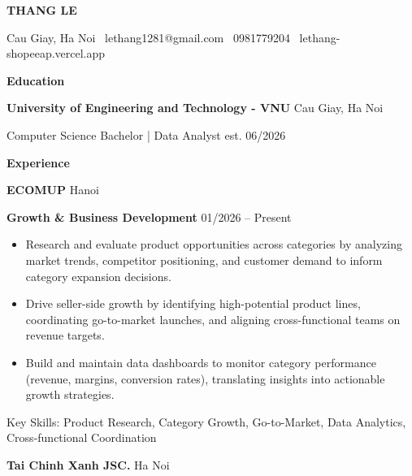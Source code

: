 \documentclass[11pt]{article}
\begin{document}
\begin{center}
    \huge \textbf{THANG LE}\\
    \hrulefill
\end{center}

\begin{center}
    Cau Giay, Ha Noi \textbullet \ lethang1281@gmail.com \textbullet \ 0981779204
    \textbullet \ lethang-shopeeap.vercel.app
\end{center}

\vspace{0.5pt}

\begin{center}
    \textbf{Education}
\end{center}
\textbf{University of Engineering and Technology - VNU} \hfill Cau Giay, Ha Noi

Computer Science Bachelor | Data Analyst \hfill est. 06/2026
\vspace{12pt}

\begin{center}
    \textbf{Experience}
\end{center}
\textbf{ECOMUP} \hfill Hanoi

\textbf{Growth \& Business Development} \hfill 01/2026 -- Present
\begin{itemize}[noitemsep, topsep=0pt, partopsep=0pt, parsep=0pt]
    \item Research and evaluate product opportunities across categories by analyzing market trends, competitor positioning, and customer demand to inform category expansion decisions.
    \item Drive seller-side growth by identifying high-potential product lines, coordinating go-to-market launches, and aligning cross-functional teams on revenue targets.
    \item Build and maintain data dashboards to monitor category performance (revenue, margins, conversion rates), translating insights into actionable growth strategies.
\end{itemize}
Key Skills: Product Research, Category Growth, Go-to-Market, Data Analytics, Cross-functional Coordination

\vspace{12pt}

\textbf{Tai Chinh Xanh JSC.} \hfill Ha Noi
\end{document}
